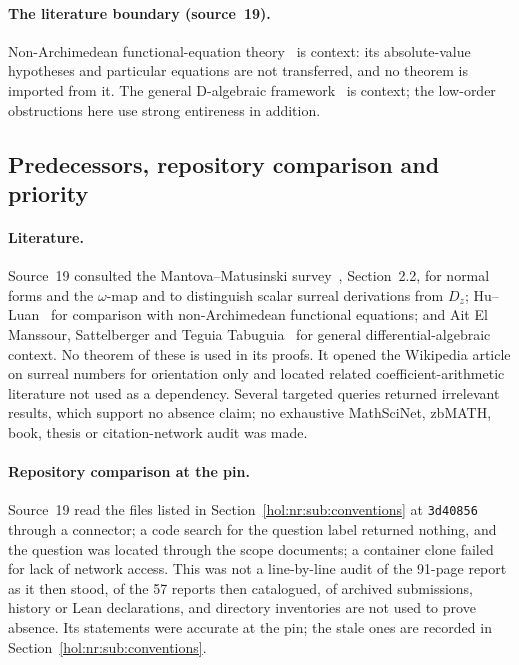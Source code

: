 \documentclass[11pt]{article}
\numberwithin{equation}{section}
\theoremstyle{definition}
\theoremstyle{remark}
\begin{document}
\paragraph{The literature boundary (source~19).}
Non-Archimedean functional-equation theory~\cite{huluan} is context: its
absolute-value hypotheses and particular equations are not transferred, and
no theorem is imported from it. The general D-algebraic framework~\cite{ast}
is context; the low-order obstructions here use strong entireness in
addition.

\subsection{Predecessors, repository comparison and priority}
\label{hol:nr:sub:predecessors}

\paragraph{Literature.}
Source~19 consulted the Mantova--Matusinski survey~\cite{mantovamatusinski},
Section~2.2, for normal forms and the $\omega$-map and to distinguish scalar
surreal derivations from $D_z$; Hu--Luan~\cite{huluan} for comparison with
non-Archimedean functional equations; and Ait El Manssour, Sattelberger and
Teguia Tabuguia~\cite{ast} for general differential-algebraic context. No
theorem of these is used in its proofs. It opened the Wikipedia article on
surreal numbers for orientation only and located related coefficient-arithmetic
literature not used as a dependency. Several targeted queries returned
irrelevant results, which support no absence claim; no exhaustive MathSciNet,
zbMATH, book, thesis or citation-network audit was made.

\paragraph{Repository comparison at the pin.}
Source~19 read the files listed in Section~\ref{hol:nr:sub:conventions} at
\texttt{3d40856} through a connector; a code search for the question label
returned nothing, and the question was located through the scope documents; a
container clone failed for lack of network access. This was not a
line-by-line audit of the 91-page report as it then stood, of the 57 reports
then catalogued, of archived submissions, history or Lean declarations, and
directory inventories are not used to prove absence. Its statements were
accurate at the pin; the stale ones are recorded in
Section~\ref{hol:nr:sub:conventions}.
\end{document}
